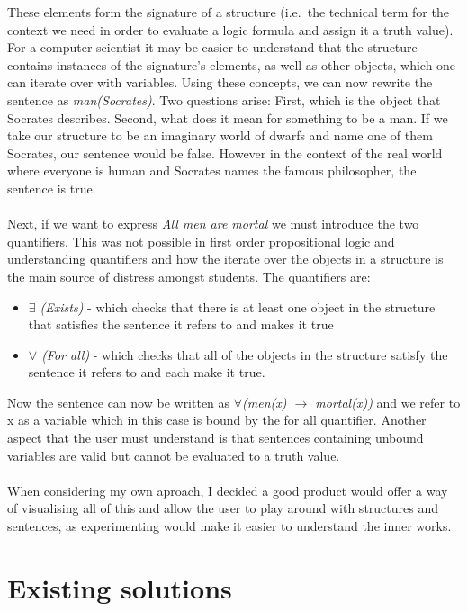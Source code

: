 \documentclass{report}
\begin{document}
\noindent These elements form the signature of a structure (i.e.\ the technical 
term for the context we need in order to evaluate a logic formula and assign it
a truth value). For a computer scientist it may be easier to understand that the
structure contains instances of the signature's elements, as well as other
objects, which one can iterate over with variables. Using these concepts, we can
now rewrite the sentence as \emph{man(Socrates)}. Two questions arise: First,
which is the object that Socrates describes. Second, what does it mean for
something to be a man. If we take our structure to be an imaginary world of
dwarfs and name one of them Socrates, our sentence would be false. However in
the context of the real world where everyone is human and Socrates names the
famous philosopher, the sentence is true. \\ \\
Next, if we want to express \emph{All men are mortal} we must introduce the two
quantifiers. This was not possible in first order propositional logic and
understanding quantifiers and how the iterate over the objects in a structure is
the main source of distress amongst students. The quantifiers are:

	\begin{itemize}
	\item \emph{$\exists$ (Exists)} 
  - which checks that there is at least one object in the structure that
    satisfies the sentence it refers to and makes it true
	\item \emph{$\forall$ (For all)}
  - which checks that all of the objects in the structure satisfy the sentence
    it refers to and each make it true.
	\end{itemize}

\noindent Now the sentence can now be written as
\emph{$\forall$(men(x) $\rightarrow$ mortal(x))}
and we refer to x as a variable which in this case is bound by the for all
quantifier. Another aspect that the user must understand is that sentences
containing unbound variables are valid but cannot be evaluated to a truth
value.\\ \\
When considering my own aproach, I decided a good product would offer a way of
visualising all of this and allow the user to play around with structures and
sentences, as experimenting would make it easier to understand the inner works.

\section{Existing solutions}
\end{document}
